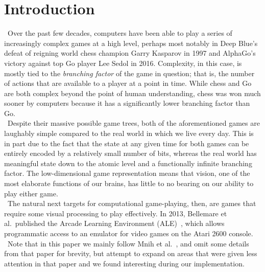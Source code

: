 \documentclass[conference]{IEEEtran}
\begin{document}
\section{Introduction}
\noindent\ Over the past few decades, computers have been able to play a series
of increasingly complex games at a high level, perhaps most notably in Deep
Blue's defeat of reigning world chess champion Garry Kasparov in 1997 and
AlphaGo's victory against top Go player Lee Sedol in 2016. Complexity, in this
case, is mostly tied to the \emph{branching factor} of the game in question;
that is, the number of actions that are available to a player at a point in
time.  While chess and Go are both complex beyond the point of human
understanding, chess was won much sooner by computers because it has a
significantly lower branching factor than Go.\\
\indent\ Despite their massive possible game trees, both of the aforementioned
games are laughably simple compared to the real world in which we live every
day. This is in part due to the fact that the state at any given time for both
games can be entirely encoded by a relatively small number of bits, whereas the
real world has meaningful state down to the atomic level and a functionally
infinite branching factor.  The low-dimensional game representation means that
vision, one of the most elaborate functions of our brains, has little to no
bearing on our ability to play either game.\\
\indent\ The natural next targets for computational game-playing, then, are
games that require some visual processing to play effectively. In 2013,
Bellemare et al.\ published the Arcade Learning Environment
(ALE)~\cite{bellemare13arcade}, which allows programmatic access to an emulator
for video games on the Atari 2600 console.\\
\indent\ Note that in this paper we mainly follow Mnih et
al.~\cite{mnih2013playing}, and omit some details from that paper for brevity,
but attempt to expand on areas that were given less attention in that paper and
we found interesting during our implementation.
\end{document}
